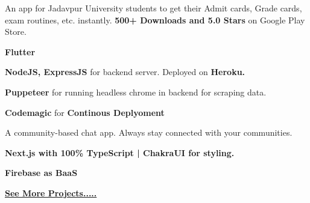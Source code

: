 \documentclass[]{deedy-resume-openfont}
\begin{document}
\begin{minipage}[t]{0.67\textwidth}
An app for Jadavpur University students to get their Admit cards, Grade cards, exam routines, etc. instantly. \textbf{500+ Downloads and 5.0 Stars} on Google Play Store.\\
\begin{tightemize}
\item \textbf{Flutter}
\item \textbf{NodeJS, ExpressJS} for backend server. Deployed on \textbf{Heroku.}
\item \textbf{Puppeteer} for running headless chrome in backend for scraping data.
\item \textbf{Codemagic} for \textbf{Continous Deplyoment}
\end{tightemize}
\sectionsep



A community-based chat app. Always stay connected with your communities.\\
\begin{tightemize}
\item \textbf{Next.js with 100\% TypeScript | ChakraUI for styling.}
\item \textbf{Firebase as BaaS}
\end{tightemize}
\sectionsep
\href{https://kishans.in/projects}{\bf{See More Projects.....}}


\end{minipage}
\end{document}
